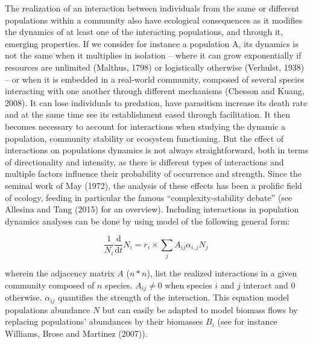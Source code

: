 \documentclass[12pt]{article}
\begin{document}
The realization of an interaction between individuals from the same or
different populations within a community also have ecological
consequences as it modifies the dynamics of at least one of the
interacting populations, and through it, emerging properties. If we
consider for instance a population A, its dynamics is not the same when
it multiplies in isolation -- where it can grow exponentially if
resources are unlimited (Malthus, 1798) or logistically otherwise
(Verhulst, 1938) -- or when it is embedded in a real-world community,
composed of several species interacting with one another through
different mechanisms (Chesson and Kuang, 2008). It can lose individuals
to predation, have parasitism increase its death rate and at the same
time see its establishment eased through facilitation. It then becomes
necessary to account for interactions when studying the dynamic a
population, community stability or ecosystem functioning. But the effect
of interactions on populations dynamics is not always straightforward,
both in terms of directionality and intensity, as there is different
types of interactions and multiple factors influence their probability
of occurrence and strength. Since the seminal work of May (1972), the
analysis of these effects has been a prolific field of ecology, feeding
in particular the famous \enquote{complexity-stability debate} (see
Allesina and Tang (2015) for an overview). Including interactions in
population dynamics analyses can be done by using model of the following
general form:

\[
\frac{1}{N_i}\frac{\text{d}}{\text{d}t}N_i = r_i \times \sum_j A_{ij} \alpha_{i,j} N_j \,
\]

wherein the adjacency matrix \(A\) (\(n*n\)), list the realized
interactions in a given community composed of \(n\) species.
\(A_{ij} \neq 0\) when species \(i\) and \(j\) interact and \(0\)
otherwise. \(\alpha_{ij}\) quantifies the strength of the interaction.
This equation model populations abundance \(N\) but can easily be
adapted to model biomass flows by replacing populations' abundances by
their biomasses \(B_i\) (see for instance Williams, Brose and Martinez
(2007)).
\end{document}
